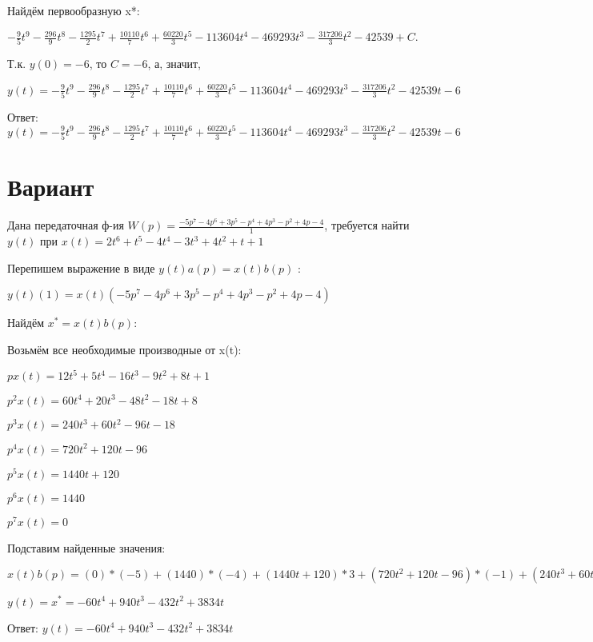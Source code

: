 \documentclass{article}
\begin{document}
{Найдём первообразную x*:

$-\frac{9}{5}t^{9}-\frac{296}{9}t^{8}-\frac{1295}{2}t^{7}+\frac{10110}{7}t^{6}+\frac{60220}{3}t^{5}-113604t^{4}-469293t^{3}-\frac{317206}{3}t^{2}-42539+C.$

Т.к. $y(0)=-6$, то $C=-6$, а, значит, 

$y(t)=-\frac{9}{5}t^{9}-\frac{296}{9}t^{8}-\frac{1295}{2}t^{7}+\frac{10110}{7}t^{6}+\frac{60220}{3}t^{5}-113604t^{4}-469293t^{3}-\frac{317206}{3}t^{2}-42539t-6$

Ответ: $y(t) = -\frac{9}{5}t^{9}-\frac{296}{9}t^{8}-\frac{1295}{2}t^{7}+\frac{10110}{7}t^{6}+\frac{60220}{3}t^{5}-113604t^{4}-469293t^{3}-\frac{317206}{3}t^{2}-42539t-6$

\section{Вариант}

Дана передаточная ф-ия $W(p)=\frac{-5p^{7}-4p^{6}+3p^{5}-p^{4}+4p^{3}-p^{2}+4p-4}{1}$, требуется найти $y(t)$ при $x(t)=2t^{6}+t^{5}-4t^{4}-3t^{3}+4t^{2}+t+1$

Перепишем выражение в виде $y(t)a(p)=x(t)b(p)$ :

$y(t)(1)=x(t)(-5p^{7}-4p^{6}+3p^{5}-p^{4}+4p^{3}-p^{2}+4p-4)$

Найдём $x^*=x(t)b(p)$:

Возьмём все необходимые производные от x(t):

$px(t)=12t^{5}+5t^{4}-16t^{3}-9t^{2}+8t+1$

$p^2x(t)=60t^{4}+20t^{3}-48t^{2}-18t+8$

$p^3x(t)=240t^{3}+60t^{2}-96t-18$

$p^4x(t)=720t^{2}+120t-96$

$p^5x(t)=1440t+120$

$p^6x(t)=1440$

$p^7x(t)=0$

Подставим найденные значения:

$x(t)b(p) = (0)*(-5)+(1440)*(-4)+(1440t+120)*3+(720t^{2}+120t-96)*(-1)+(240t^{3}+60t^{2}-96t-18)*4+(60t^{4}+20t^{3}-48t^{2}-18t+8)*(-1)+(12t^{5}+5t^{4}-16t^{3}-9t^{2}+8t+1)*4+(12t^{5}+5t^{4}-16t^{3}-9t^{2}+8t+1)*(-4)=-60t^{4}+940t^{3}-432t^{2}+3834t$





$y(t)=x^*=-60t^{4}+940t^{3}-432t^{2}+3834t$

Ответ: $y(t) = -60t^{4}+940t^{3}-432t^{2}+3834t$

}
\end{document}
